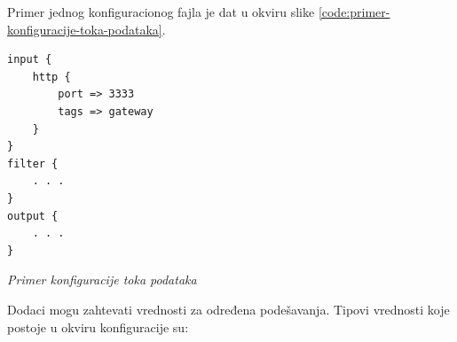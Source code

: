 \par
Primer jednog konfiguracionog fajla je dat u okviru slike \ref{code:primer-konfiguracije-toka-podataka}.
\begin{listing}[H]
\begin{verbatim}
input {
    http {
        port => 3333
        tags => gateway
    }
}
filter {
    . . . 
}
output {
    . . .
}
\end{verbatim}
\caption{\textit{Primer konfiguracije toka podataka}}
\label{code:primer-konfiguracije-toka-podataka}
\end{listing}

\par
Dodaci mogu zahtevati vrednosti za određena podešavanja. Tipovi vrednosti koje postoje u okviru konfiguracije su:
